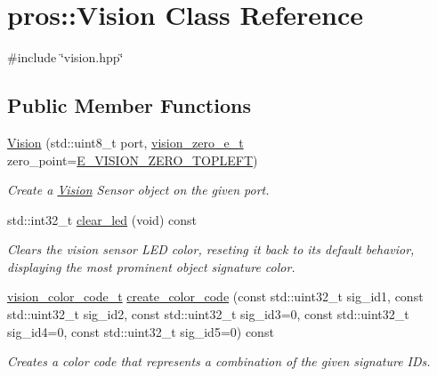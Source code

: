 \hypertarget{classpros_1_1Vision}{}\section{pros\+:\+:Vision Class Reference}
\label{classpros_1_1Vision}


{\ttfamily \#include \char`\"{}vision.\+hpp\char`\"{}}

\subsection*{Public Member Functions}
\begin{DoxyCompactItemize}
\item 
\hyperlink{classpros_1_1Vision_a46cdaf74713f630b5bb5f4d0d3259dcd}{Vision} (std\+::uint8\+\_\+t port, \hyperlink{vision_8h_a2e8bc1c48f8aab12275bfc1868fbbad6}{vision\+\_\+zero\+\_\+e\+\_\+t} zero\+\_\+point=\hyperlink{vision_8h_aef7c8269b3fb0dfbf4e597b2d8dd7af5a0ff244c5f3e9771f962986e25b00ff3d}{E\+\_\+\+V\+I\+S\+I\+O\+N\+\_\+\+Z\+E\+R\+O\+\_\+\+T\+O\+P\+L\+E\+FT})
\begin{DoxyCompactList}\small\item\em Create a \hyperlink{classpros_1_1Vision}{Vision} Sensor object on the given port. \end{DoxyCompactList}\item 
std\+::int32\+\_\+t \hyperlink{classpros_1_1Vision_a00f02cfb09ca224c2a7735be918e941d}{clear\+\_\+led} (void) const
\begin{DoxyCompactList}\small\item\em Clears the vision sensor L\+ED color, reseting it back to its default behavior, displaying the most prominent object signature color. \end{DoxyCompactList}\item 
\hyperlink{vision_8h_a71f2011a47e95558bb534b05c16c7f2b}{vision\+\_\+color\+\_\+code\+\_\+t} \hyperlink{classpros_1_1Vision_ab50bcfb700b591e2f1654962baac400f}{create\+\_\+color\+\_\+code} (const std\+::uint32\+\_\+t sig\+\_\+id1, const std\+::uint32\+\_\+t sig\+\_\+id2, const std\+::uint32\+\_\+t sig\+\_\+id3=0, const std\+::uint32\+\_\+t sig\+\_\+id4=0, const std\+::uint32\+\_\+t sig\+\_\+id5=0) const
\begin{DoxyCompactList}\small\item\em Creates a color code that represents a combination of the given signature I\+Ds. \end{DoxyCompactList}\item 

\end{DoxyCompactItemize}
